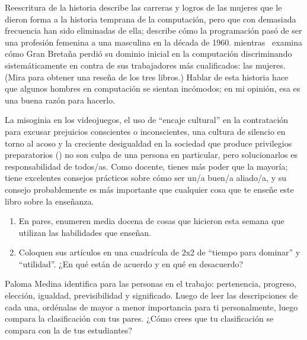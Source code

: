 \begin{aside}{Reescritura de la historia}
  \cite{Abba2012} describe las carreras y logros de
    las mujeres que le dieron forma a la historia temprana de la computación,
    pero que con demasiada frecuencia han sido eliminadas de ella; 
    \cite{Ensm2003,Ensm2012} describe cómo la programación pasó de ser una profesión femenina a una masculina en la década de 1960.
    mientras~\cite{Hick2018} examina cómo Gran Bretaña perdió su dominio inicial en la computación
    discriminando sistemáticamente en contra de sus trabajadores más cualificados:
    las mujeres.
    (Mira \cite{Milt2018} para obtener una reseña de los tres libros.)
    Hablar de esta historia hace que algunos hombres en computación se sientan incómodos;
    en mi opinión,
    esa es una buena razón para hacerlo.
\end{aside}

La misoginia en los videojuegos,
el uso de ``encaje cultural'' en la contratación para excusar prejuicios conscientes o inconscientes,
una cultura de silencio en torno al acoso
y la creciente desigualdad en la sociedad que produce privilegios preparatorios ()
no son culpa de una persona en particular,
pero solucionarlos es responsabilidad de todos/as.
Como docente,
tienes más poder que la mayoría;
tiene excelentes consejos prácticos sobre cómo ser un/a buen/a aliado/a,
y su consejo probablemente es más importante que cualquier cosa que te enseñe este libro sobre la enseñanza.



\begin{enumerate}

\item
  En pares,
  enumeren media docena de cosas que hicieron esta semana que utilizan las habilidades que enseñan.

\item
  Coloquen sus artículos en una cuadrícula de 2x2 de ``tiempo para dominar'' y ``utilidad''.
  ¿En qué están de acuerdo y en qué en desacuerdo?

\end{enumerate}


Paloma Medina identifica  para las personas en el trabajo:
pertenencia,
progreso,
elección,
igualdad,
previsibilidad
y significado.
Luego de leer las descripciones de cada una,
ordénalas de mayor a menor importancia para ti personalmente,
luego compara la clasificación con tus pares.
¿Cómo crees que tu clasificación se compara con la de tus estudiantes?

